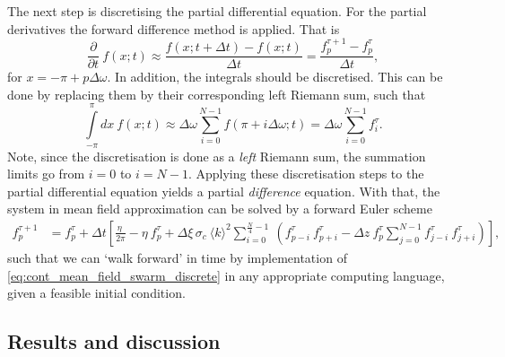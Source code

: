 The next step is discretising the partial differential equation. For the partial derivatives the forward difference method is applied. That is 
\begin{equation}
\label{eq:forward_difference_f}
\frac{\partial}{\partial t}\ f(x;t) \approx \frac{f(x;t+\Delta t) - f(x;t)}{\Delta t} = \frac{f_{p}^{\tau+1} - f_{p}^{\tau}}{\Delta t},
\end{equation}
for $x = -\pi + p \Delta \omega$. In addition, the integrals should be discretised. This can be done by replacing them by their corresponding left Riemann sum, such that
\begin{equation}
\label{eq:left_riemann}
\int\limits_{-\pi}^\pi dx\ f(x;t) \approx \Delta \omega  \sum\limits_{i=0}^{N-1}  f(\pi + i \Delta \omega;t) = \Delta \omega \sum\limits_{i=0}^{N-1}  f_{i}^{\tau}.
\end{equation}
Note, since the discretisation is done as a \textit{left} Riemann sum, the summation limits go from $i=0$ to $i=N-1$. Applying these discretisation steps to the partial differential equation yields a partial \textit{difference} equation. With that, the system in mean field approximation can be solved by a forward Euler scheme
\begin{equation}
\begin{aligned}
f_p^{\tau+1} &= 
f_p^\tau +
\Delta t \left[ \frac{\eta\ }{2 \pi} -\eta\ f_p^\tau 
+ \Delta \xi\, \sigma_c\ \langle k \rangle^2  \sum\limits_{i=0}^{\frac{N}{4}-1}\ \left( f_{p-i} ^\tau\ f_{p+i}^\tau
- \Delta z\ f_p^\tau \sum\limits_{j=0}^{N-1} f_{j-i}^\tau\ f_{j+i}^\tau \right)  \right],
\end{aligned}
\label{eq:cont_mean_field_swarm_discrete}
\end{equation}
such that we can `walk forward' in time by implementation of \cref{eq:cont_mean_field_swarm_discrete} in any appropriate computing language, given a feasible initial condition. 
\clearpage

\subsection{Results and discussion}

